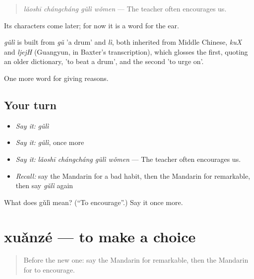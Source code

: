 \begin{quote}
\emph{lǎoshī chángcháng gǔlì wǒmen} — The teacher often encourages us.
\end{quote}

Its characters come later; for now it is a word for the ear.

\begin{cousinweb}
\emph{gǔlì} is built from \emph{gǔ} 'a drum' and \emph{lì}, both inherited from Middle Chinese, \emph{kuX} and \emph{ljejH} (Guangyun, in Baxter's transcription), which glosses the first, quoting an older dictionary, 'to beat a drum', and the second 'to urge on'.
\end{cousinweb}

\begin{grammarlens}[title={What you've built}]
One more word for giving reasons.
\end{grammarlens}

\subsection*{Your turn}
\begin{itemize}
\raggedright
  \item \emph{Say it:} \emph{gǔlì}
  \item \emph{Say it:} \emph{gǔlì}, once more
  \item \emph{Say it:} \emph{lǎoshī chángcháng gǔlì wǒmen} — The teacher often encourages us.
  \item \emph{Recall:} say the Mandarin for a bad habit, then the Mandarin for remarkable, then say \emph{gǔlì} again
\end{itemize}

\begin{tcolorbox}[breakable,colback=teal!4,colframe=teal!35!black,title={Before you move on}]
What does gǔlì mean? (\textquotedblleft{}To encourage\textquotedblright{}.) Say it once more.
\end{tcolorbox}
\section[xuǎnzé]{xuǎnzé — to make a choice}

\label{lesson:ZH-C368-xuanze}



\begin{quote}
Before the new one: say the Mandarin for remarkable, then the Mandarin for to encourage.
\end{quote}

